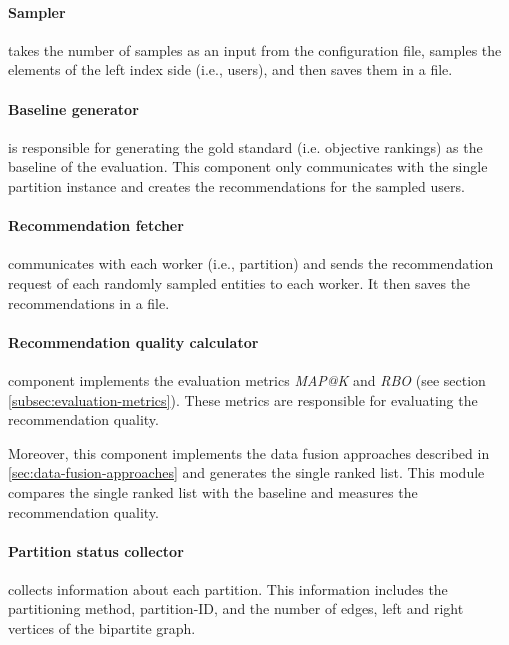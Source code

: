 \paragraph{Sampler}
takes the number of samples as an input from the configuration file, samples the elements of the left index side (i.e., users), and then saves them in a file.

\paragraph{Baseline generator}
is responsible for generating the gold standard (i.e. objective rankings) as the baseline of the evaluation. This component only communicates with the single partition instance and creates the recommendations for the sampled users.

\paragraph{Recommendation fetcher}
communicates with each worker (i.e., partition) and sends the recommendation request of each randomly sampled entities to each worker. It then saves the recommendations in a file.

\paragraph{Recommendation quality calculator}
component implements the evaluation metrics \emph{MAP@K} and \emph{RBO} (see section \ref{subsec:evaluation-metrics}). These metrics are responsible for evaluating the recommendation quality.

Moreover, this component implements the data fusion approaches described in \ref{sec:data-fusion-approaches} and generates the single ranked list. This module compares the single ranked list with the baseline and measures the recommendation quality.


\paragraph{Partition status collector}
collects information about each partition. This information includes the partitioning method, partition-ID, and the number of edges, left and right vertices of the bipartite graph.

